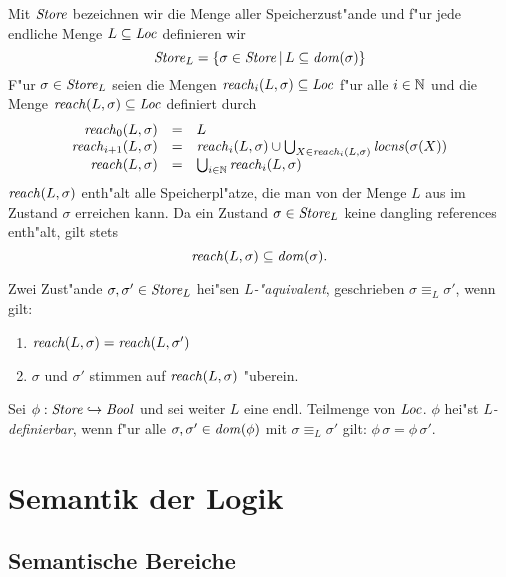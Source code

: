 \documentclass[12pt,a4paper,bigheadings]{scrartcl}
\newcommand{\locns}{\name{locns}}
\begin{document}
Mit ${\text{\it Store\/}}$ bezeichnen wir die Menge aller Speicherzust"ande und f"ur jede endliche Menge
$L \subseteq {\text{\it Loc\/}}$ definieren wir
\[
  {\text{\it Store\/}}_L = \{\sigma\in{\text{\it Store\/}}\,|\,L\subseteq{\text{\it dom\/}}(\sigma)\}
\]
F"ur $\sigma\in{\text{\it Store\/}}_L$ seien die Mengen ${\text{\it reach\/}}_i(L,\sigma)\subseteq {\text{\it Loc\/}}$ f"ur alle
$i\in{\mathord{\mathbb N}}$ und die Menge ${\text{\it reach\/}}(L,\sigma)\subseteq{\text{\it Loc\/}}$ definiert durch
\[\begin{array}{rcl}
  \name{reach}_0(L,\sigma) & = & L \\
  \name{reach}_{i+1}(L,\sigma) & = & \name{reach}_i(L,\sigma)
             \cup \bigcup_{X\in\name{reach}_i(L,\sigma)} \locns(\sigma(X)) \\
  \name{reach}(L,\sigma) & = & \bigcup_{i\in\setN} \name{reach}_i(L,\sigma)
\end{array}\]
${\text{\it reach\/}}(L,\sigma)$ enth"alt alle Speicherpl"atze, die man von der Menge $L$ aus im
Zustand $\sigma$ erreichen kann. Da ein Zustand $\sigma\in{\text{\it Store\/}}_L$ keine dangling references
enth"alt, gilt stets
\[
  {\text{\it reach\/}}(L,\sigma) \subseteq {\text{\it dom\/}}(\sigma).
\]

\begin{definition}[$L$-"Aquivalenz]
  Zwei Zust"ande $\sigma,\sigma'\in{\text{\it Store\/}}_L$ hei"sen {\em $L$-"aquivalent}, geschrieben
  $\sigma \equiv_L \sigma'$, wenn gilt:
  \begin{enumerate}
    \item ${\text{\it reach\/}}(L,\sigma) = {\text{\it reach\/}}(L,\sigma')$
    \item $\sigma$ und $\sigma'$ stimmen auf ${\text{\it reach\/}}(L,\sigma)$ "uberein.
  \end{enumerate}
\end{definition}

\begin{definition}[$L$-Definierbarkeit]
  Sei $\phi : {\text{\it Store\/}} \hookrightarrow {\text{\it Bool\/}}$ und sei weiter $L$ eine endl. Teilmenge von ${\text{\it Loc\/}}$.
  $\phi$ hei"st {\em $L$-definierbar}, wenn f"ur alle $\sigma,\sigma'\in{\text{\it dom\/}}(\phi)$ mit
  $\sigma \equiv_L \sigma'$ gilt: $\phi\,\sigma = \phi\,\sigma'$.
\end{definition}


\section{Semantik der Logik}

\subsection{Semantische Bereiche}
\end{document}
